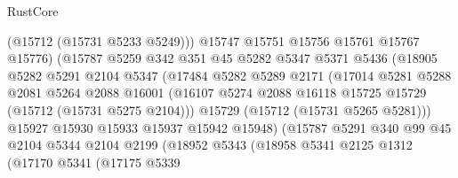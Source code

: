 \begin{lexlean}{RustCore}
\begin{coremodule}
                              (@15712 (@15731 @5233 @5249)))
                            @15747
                            @15751
                            @15756
                            @15761
                            @15767
                            @15776)
                          (@15787
                            @5259
                            @342
                            @351
                            @45
                            @5282
                            @5347
                            @5371
                            @5436
                            (@18905
                              @5282
                              @5291
                              @2104
                              @5347
                              (@17484
                                @5282
                                @5289
                                @2171
                                (@17014
                                  @5281
                                  @5288
                                  @2081
                                  @5264
                                  @2088
                                  @16001
                                  (@16107
                                    @5274
                                    @2088
                                    @16118
                                    @15725
                                    @15729
                                    (@15712 (@15731 @5275 @2104)))
                                  @15729
                                  (@15712 (@15731 @5265 @5281)))
                                @15927
                                @15930
                                @15933
                                @15937
                                @15942
                                @15948)
                              (@15787
                                @5291
                                @340
                                @99
                                @45
                                @2104
                                @5344
                                @2104
                                @2199
                                (@18952
                                  @5343
                                  (@18958
                                    @5341
                                    @2125
                                    @1312
                                    (@17170
                                      @5341
                                      (@17175
                                        @5339

\end{coremodule}
\end{lexlean}
